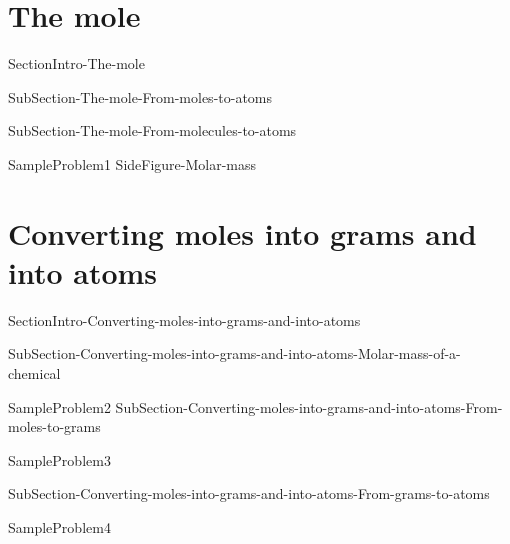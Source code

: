 \documentclass[main.tex]{subfiles}
\begin{document}
\section{The mole}
{SectionIntro-The-mole}

\sloppy \begin{description}

{SubSection-The-mole-From-moles-to-atoms}



{SubSection-The-mole-From-molecules-to-atoms}
 


 \hspace{-5cm}{Figure-The-mole}
{SampleProblem1}
{SideFigure-Molar-mass}

\end{description}
	





\section{Converting moles into grams and into atoms}
{SectionIntro-Converting-moles-into-grams-and-into-atoms}


\sloppy \begin{description}

{SubSection-Converting-moles-into-grams-and-into-atoms-Molar-mass-of-a-chemical}




{SampleProblem2}
{SubSection-Converting-moles-into-grams-and-into-atoms-From-moles-to-grams}








 \hspace{2cm}{Figure-Mole-equivalency}





{SampleProblem3}

 

{SubSection-Converting-moles-into-grams-and-into-atoms-From-grams-to-atoms}



{SampleProblem4}


\end{description}
\end{document}
